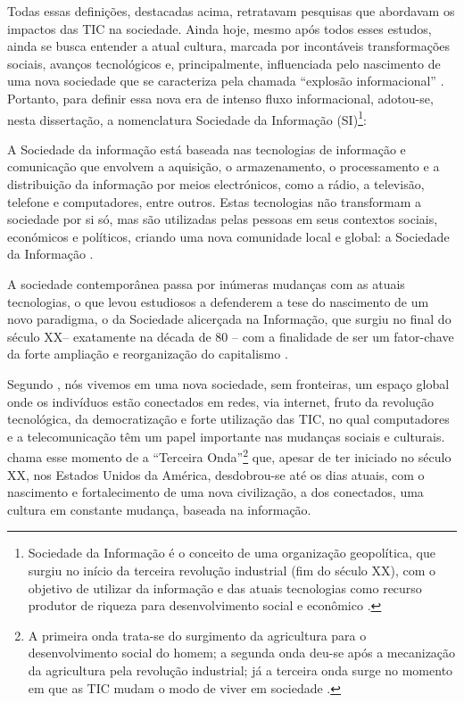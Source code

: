 \documentclass[portuguese]{textolivre}
\begin{document}
Todas essas definições, destacadas acima, retratavam pesquisas que
abordavam os impactos das TIC na sociedade. Ainda hoje, mesmo após todos
esses estudos, ainda se busca entender a atual cultura, marcada por
incontáveis transformações sociais, avanços tecnológicos e,
principalmente, influenciada pelo nascimento de uma nova sociedade que
se caracteriza pela chamada ``explosão informacional''
\cite{bell1990, gouveia2004a}. Portanto, para definir essa nova era de
intenso fluxo informacional, adotou-se, nesta dissertação, a
nomenclatura Sociedade da Informação (SI)\footnote{Sociedade da
  Informação é o conceito de uma organização geopolítica, que surgiu no
  início da terceira revolução industrial (fim do século XX), com o
  objetivo de utilizar da informação e das atuais tecnologias como
  recurso produtor de riqueza para desenvolvimento social e econômico
  \cite{castells2016}.}:

A Sociedade da informação está baseada nas tecnologias de informação e
comunicação que envolvem a aquisição, o armazenamento, o processamento e
a distribuição da informação por meios electrónicos, como a rádio, a
televisão, telefone e computadores, entre outros. Estas tecnologias não
transformam a sociedade por si só, mas são utilizadas pelas pessoas em
seus contextos sociais, económicos e políticos, criando uma nova
comunidade local e global: a Sociedade da Informação
\cite[p.~10]{gouveia2004a}.

A sociedade contemporânea passa por inúmeras mudanças com as atuais
tecnologias, o que levou estudiosos a defenderem a tese do nascimento de
um novo paradigma, o da Sociedade alicerçada na Informação, que surgiu
no final do século XX-- exatamente na década de 80 -- com a finalidade
de ser um fator-chave da forte ampliação e reorganização do capitalismo
\cite{morin2003, castells2016}.

Segundo \textcite[p.~78]{castells2016}, nós vivemos em uma nova sociedade, sem
fronteiras, um espaço global onde os indivíduos estão conectados em
redes, via internet, fruto da revolução tecnológica, da democratização e
forte utilização das TIC, no qual computadores e a telecomunicação têm
um papel importante nas mudanças sociais e culturais. \textcite{toffler2002}
chama esse momento de a ``Terceira Onda''\footnote{A primeira onda
  trata-se do surgimento da agricultura para o desenvolvimento social do
  homem; a segunda onda deu-se após a mecanização da agricultura pela
  revolução industrial; já a terceira onda surge no momento em que as
  TIC mudam o modo de viver em sociedade \cite{toffler2002}.} que,
apesar de ter iniciado no século XX, nos Estados Unidos da América,
desdobrou-se até os dias atuais, com o nascimento e fortalecimento de
uma nova civilização, a dos conectados, uma cultura em constante
mudança, baseada na informação.
\end{document}
